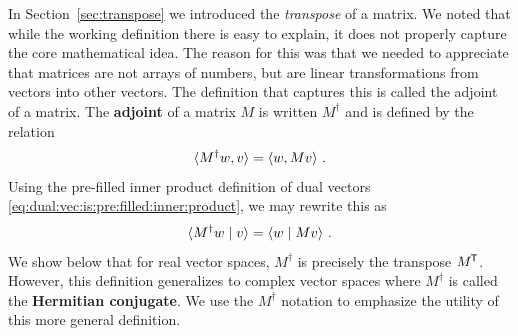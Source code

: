 \documentclass[12pt, oneside]{report}    %
\begin{document}
In Section~\ref{sec:transpose} we introduced the \emph{transpose} of a matrix. We noted that while the working definition there is easy to explain, it does not properly capture the core mathematical idea. The reason for this was that we needed to appreciate that matrices are not arrays of numbers, but are linear transformations from vectors into other vectors. The definition that captures this is called the adjoint of a matrix. The \textbf{adjoint} of a matrix $M$ is written $M^\dag$ and is defined by the relation
\begin{align}
    \langle M^\dag w, v \rangle = \langle w, M v \rangle \ . 
\end{align}
Using the pre-filled inner product definition of dual vectors \eqref{eq:dual:vec:is:pre:filled:inner:product}, we may rewrite this as
\begin{align}
    \langle M^\dag w \mid v \rangle = \langle w \mid M v \rangle \ .
\end{align}
We show below that for real vector spaces, $M^\dag$ is precisely the transpose $M^{\mkern-1.5mu\mathsf{T}}$. However, this definition generalizes to complex vector spaces where $M^\dag$ is called the \textbf{Hermitian conjugate}. We use the $M^\dagger$ notation to emphasize the utility of this more general definition. 
\end{document}
